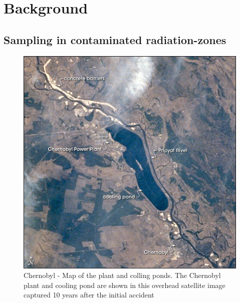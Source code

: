 \section{Background}
\label{section:background}

\subsection{Sampling in contaminated radiation-zones}
\begin{figure}
	\centering
	\includegraphics[width=0.5\linewidth]{chernobyl_plant_map}
	\caption{Chernobyl - Map of the plant and colling ponds. The Chernobyl plant and cooling pond are shown in this overhead satellite image captured 10 years after the initial accident}
	\label{fig:chernobylplantmap}
\end{figure}



